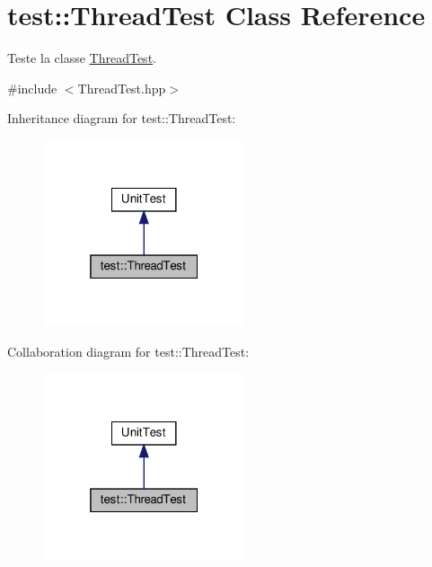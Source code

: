 \hypertarget{classtest_1_1ThreadTest}{}\section{test\+:\+:Thread\+Test Class Reference}
\label{classtest_1_1ThreadTest}


Teste la classe \hyperlink{classtest_1_1ThreadTest}{Thread\+Test}.  




{\ttfamily \#include $<$Thread\+Test.\+hpp$>$}



Inheritance diagram for test\+:\+:Thread\+Test\+:
\nopagebreak
\begin{figure}[H]
\begin{center}
\leavevmode
\includegraphics[width=169pt]{classtest_1_1ThreadTest__inherit__graph}
\end{center}
\end{figure}


Collaboration diagram for test\+:\+:Thread\+Test\+:
\nopagebreak
\begin{figure}[H]
\begin{center}
\leavevmode
\includegraphics[width=169pt]{classtest_1_1ThreadTest__coll__graph}
\end{center}
\end{figure}
